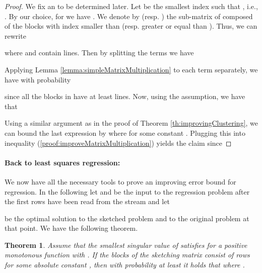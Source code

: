 \documentclass[a4paper,11pt,oneside,english,onecolumn]{article}
\newtheorem{theorem}{Theorem}
\theoremstyle{definition}
\begin{document}
\begin{proof}
We fix an  to be determined later. Let  be the smallest index such that , i.e., . By our choice, for  we have . We denote by  (resp. ) the sub-matrix of  composed of the blocks with index smaller than  (resp. greater or equal than ). Thus, we can rewrite

where  and  contain  lines. Then by splitting the terms we have 

Applying Lemma \ref{lemma:simpleMatrixMultiplication} to each term separately, we have with probability  

since all the blocks in  have at least  lines.
Now, using the assumption, we have that


Using a similar argument as in the proof of Theorem \ref{th:improvingClustering}, we can bound the last expression by  where  for some constant . Plugging this into inequality (\ref{proof:improveMatrixMultiplication}) yields the claim since

\end{proof}

\paragraph{Back to least squares regression:}
We now have all the necessary tools to prove an improving error bound for regression. In the following let  and  be the input to the regression problem after the first  rows have been read from the stream and let

be the optimal solution to the sketched problem and to the original problem at that point. We have the following theorem.
\begin{theorem}
\label{th:improveRegression}
Assume that the smallest singular value  of  satisfies  for a positive monotonous function  with . If the blocks  of the sketching matrix  consist of  rows for some absolute constant , then with probability at least  it holds that 
where .
\end{theorem}
\end{document}
